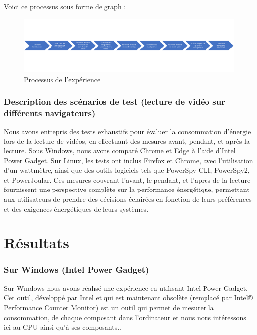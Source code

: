 \documentclass[12pt, a4paper]{report}
\begin{document}
Voici ce processus sous forme de graph :
\begin{figure}[H]
    \includegraphics[width=1\linewidth]{res//graph/process.png}
    \caption{Processus de l'expérience}
    \label{fig:experience-process}
\end{figure}



\subsection{Description des scénarios de test (lecture de vidéo sur différents navigateurs)}

Nous avons entrepris des tests exhaustifs pour évaluer la consommation d'énergie lors de la lecture de vidéos, en effectuant des mesures avant, pendant, et après la lecture. Sous Windows, nous avons comparé Chrome et Edge à l'aide d'Intel Power Gadget. Sur Linux, les tests ont inclus Firefox et Chrome, avec l'utilisation d'un wattmètre, ainsi que des outils logiciels tels que PowerSpy CLI, PowerSpy2, et PowerJoular. Ces mesures couvrant l'avant, le pendant, et l'après de la lecture fournissent une perspective complète sur la performance énergétique, permettant aux utilisateurs de prendre des décisions éclairées en fonction de leurs préférences et des exigences énergétiques de leurs systèmes.

\chapter{\centering Résultats}
\subsection{Sur Windows (Intel Power Gadget)}
Sur Windows nous avons réalisé une expérience en utilisant Intel Power Gadget. Cet outil, développé par Intel et qui est maintenant obsolète (remplacé par Intel® Performance Counter Monitor) est un outil qui permet de mesurer la consommation, de chaque composant dans l'ordinateur et nous nous intéressons ici au CPU ainsi qu'à ses composants..
\end{document}
